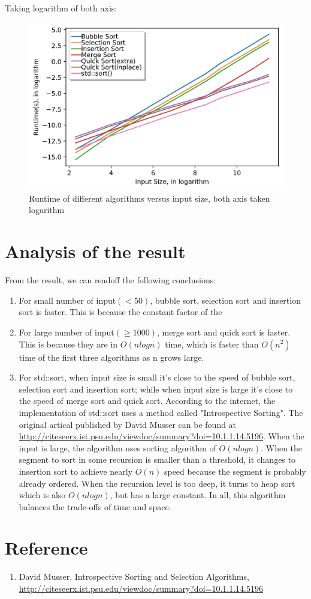 \documentclass[a4paper]{article}
\begin{document}
    Taking logarithm of both axis:
    \begin{figure}[H]
        \centering{}
        \includegraphics[width = .65\textwidth]{Figures/fig2.png}
        \centering
        \caption{Runtime of different algorithms versus input size, both axis taken logarithm}
    \end{figure}
\section{Analysis of the result}
    \par{} From the result, we can readoff the following conclusions:
    \begin{enumerate}
        \item For small number of input$\left( <50 \right)$, bubble sort, selection sort and insertion sort is faster. This is because the constant factor of the
        \item For large number of input$\left( \geq 1000 \right)$, merge sort and quick sort is faster. This is because they are in $O\left(nlogn\right)$ time, which is faster than $O\left(n^2\right)$ time of the first three algorithms as n grows large.
        \item For std::sort, when input size is small it's close to the speed of bubble sort, selection sort and insertion sort; while when input size is large it's close to the speed of merge sort and quick sort. According to the internet, the implementation of std::sort\(\) uses a method called "Introspective Sorting". The original artical published by David Musser can be found at \url{http://citeseerx.ist.psu.edu/viewdoc/summary?doi=10.1.1.14.5196}. When the input is large, the algorithm uses sorting algorithm of $O\left(nlogn\right)$. When the segment to sort in some recursion is smaller than a threshold, it changes to insertion sort to achieve nearly $O\left(n\right)$ speed because the segment is probably already ordered. When the recursion level is too deep, it turns to heap sort which is also $O\left(nlogn\right)$, but has a large constant. In all, this algorithm balances the trade-offs of time and space.
    \end{enumerate}
\section*{Reference}
    \begin{enumerate}
        \item David Musser, Introspective Sorting and Selection Algorithms, \url{http://citeseerx.ist.psu.edu/viewdoc/summary?doi=10.1.1.14.5196}
    \end{enumerate}
\end{document}
